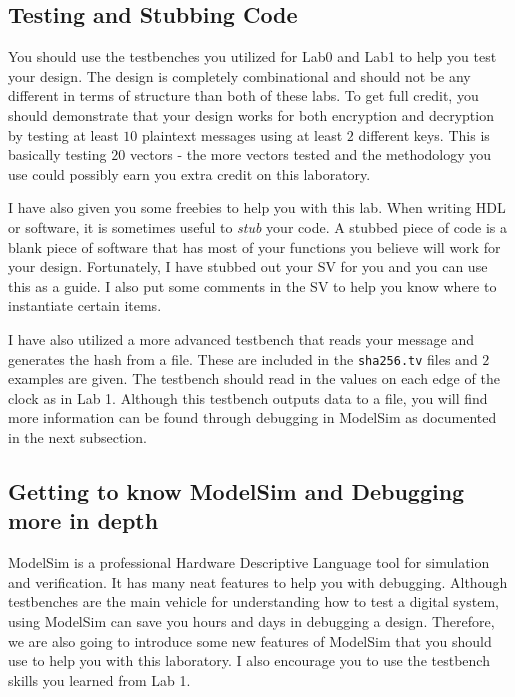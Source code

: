 \documentclass{article}
\begin{document}
\subsection{Testing and Stubbing Code}

You should use the testbenches you utilized for Lab0 and Lab1 to help
you test your design.  The design is completely combinational and
should not be any different in terms of structure than both of these
labs.  To get full credit, you should demonstrate that your design
works for both encryption and decryption by testing at least $10$
plaintext messages using at least $2$ different keys.  This is
basically testing $20$ vectors - the more vectors tested and the
methodology you use could possibly
earn you extra credit on this laboratory.

I have also given you some freebies to help you with this lab.  When
writing HDL or software, it is sometimes useful to \textit{stub} your
code.  A stubbed piece of code is a blank piece of software that has
most of your functions you believe will work for your design.
Fortunately, I have stubbed out your SV for you and you can use this
as a guide.  I also put some comments in the SV to help you know where
to instantiate certain items.

I have also utilized a more advanced testbench that reads your
message and generates the hash from a file.  These are included in the
\verb!sha256.tv! files and $2$ examples are given.  The testbench should
read in the values on each edge of the clock as in Lab 1.  Although
this testbench outputs data to a file, you will find more information
can be found through debugging in ModelSim as documented in the next
subsection.

\subsection{Getting to know ModelSim and Debugging more in depth}

ModelSim is a professional Hardware Descriptive Language tool for
simulation and verification.  It has many neat features to help you
with debugging.  Although testbenches are the main vehicle for
understanding how to test a digital system, using ModelSim can save
you hours and days in debugging a design.  Therefore, we are also
going to introduce some new features of ModelSim that you should use
to help you with this laboratory. I also encourage you to use the
testbench skills you learned from Lab 1.
\end{document}
